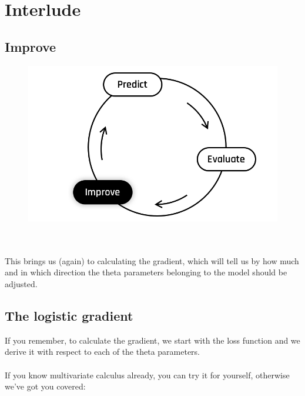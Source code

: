 
\section*{Interlude}
\subsection*{Improve}

\begin{figure}[!h]
    \centering
    \includegraphics[scale=0.25]{assets/Improve.png}
\end{figure}
\\
\\
This brings us (again) to calculating the gradient, which will tell us by
how much and in which direction the theta parameters belonging to the model should be adjusted.

\newpage
\subsection*{The logistic gradient}
If you remember, to calculate the gradient, we start with the loss function and we derive it 
with respect to each of the theta parameters.\\
\\
If you know multivariate calculus already, you can try it for yourself, otherwise we've got you covered:\\

